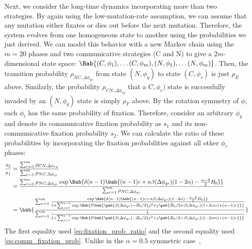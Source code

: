 Next, we consider the long-time dynamics incorporating more than two strategies.
By again using the low-mutation-rate assumption,
we can assume that any mutation either fixates
or dies out before the next mutation.
Therefore, the system evolves from one homogeneous state to another
using the probabilities we just derived.
We can model this behavior with a new Markov chain
using the $m=20$ phases and two communicative strategies (C and N)
to give a $2m$-dimensional state space:
$\Bab{(C,\phi_1), \ldots (C,\phi_m), (N,\phi_1), \ldots (N,\phi_m)}$.
Then, the transition probability $\rho_{NC,\Delta \phi_{qr}}$
from state $(N,\phi_q)$ to state $(C,\phi_r)$ is just $\rho_E$ above.
Similarly, the probability $\rho_{CN,\Delta \phi_{rq}}$
that a $C,\phi_r)$ state is successfully invaded by
an $(N,\phi_q)$ state is simply $\rho_F$ above.
By the rotation symmetry of $\phi$, each $\phi_i$ has the same probability of fixation.
Therefore, consider an arbitrary $\phi_q$ and denote its communicative fixation probability as
$s_1$ and its non-communicative fixation probability $s_2$.
We can calculate the ratio of these probabilities
by incorporating the fixation probabilities against all other $\phi_r$ phases:
\begin{align}
  \frac{s_2}{s_1} &= \frac
    {\sum_{r=1}^{m} \rho_{CN,\Delta \phi_{rq}}}
    {\sum_{r=1}^{m} \rho_{NC,\Delta \phi_{qr}} }
  \\
  &=
  \frac
  {\sum_{r=1}^{m} \rho_{NC,\Delta \phi_{qr}}
    \exp \Bab{
      \delta (n-1)
      \bab{
        (n-1) c + n \beta(\Delta \phi_{qr}) (1 - 2 \alpha)
        - \frac{n-2}{2} B_0
      }
    }
  }
  {\sum_{r=1}^{m} \rho_{NC,\Delta \phi_{qr}}}
  \\
  &=
  \bab{
    \frac
    {\sum_{r=1}^{m} \frac
      {\exp \Bab{ \delta (n-1)
        \bab{
          (n-1) c + n \beta(\Delta \phi_{qr}) (1 - 2 \alpha) - \frac{n-2}{2} B_0
        }}
      }
      {1 + \sum_{j=1}^{n-1} \exp\Bab{
        \delta \bab{
         \pab{\beta(\Delta \phi_{qr}) - B_0/2} j^2
         + j \pab{B_0/2 + \beta(\Delta \phi_{qr}) (1 - 2 \alpha n) + (n-1) c}
        }}
      }
    }
    {\sum_{r=1}^{m} \frac{1}
      {1 + \sum_{j=1}^{n-1} \exp\Bab{
        \delta \bab{
         \pab{\beta(\Delta \phi_{qr}) - B_0/2} j^2
         + j \pab{B_0/2 + \beta(\Delta \phi_{qr}) (1 - 2 \alpha n) + (n-1) c}
        }}
      }
    }
  }
  \label{eq:full_analytic_frac}
\end{align}
The first equality used \cref{eq:fixation_prob_ratio}
and the second equality used \cref{eq:comm_fixation_prob}.
Unlike in the $\alpha = 0.5$ symmetric case~\citep{tripp2022evolutionary},
